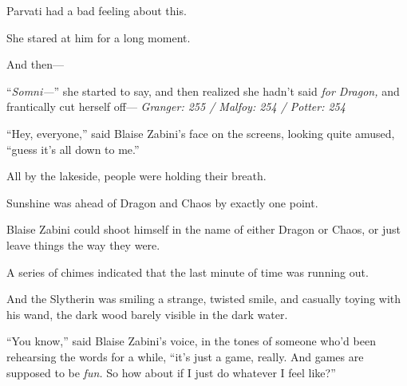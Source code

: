 Parvati had a bad feeling about this.

She stared at him for a long moment.

And then—

“\emph{Somni—}” she started to say, and then realized she hadn’t said \emph{for Dragon,} and frantically cut herself off—
\sbreak
\emph{Granger: 255 / Malfoy: 254 / Potter: 254}

“Hey, everyone,” said Blaise Zabini’s face on the screens, looking quite amused, “guess it’s all down to me.”

All by the lakeside, people were holding their breath.

Sunshine was ahead of Dragon and Chaos by exactly one point.

Blaise Zabini could shoot himself in the name of either Dragon or Chaos, or just leave things the way they were.

A series of chimes indicated that the last minute of time was running out.

And the Slytherin was smiling a strange, twisted smile, and casually toying with his wand, the dark wood barely visible in the dark water.

“You know,” said Blaise Zabini’s voice, in the tones of someone who’d been rehearsing the words for a while, “it’s just a game, really. And games are supposed to be \emph{fun.} So how about if I just do whatever I feel like?”
